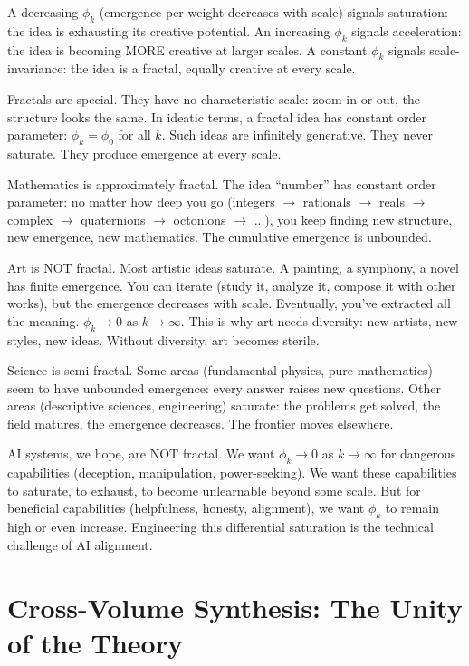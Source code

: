 \begin{interpretation}
A decreasing $\phi_k$ (emergence per weight decreases with scale) signals
saturation: the idea is exhausting its creative potential. An increasing $\phi_k$
signals acceleration: the idea is becoming MORE creative at larger scales. A
constant $\phi_k$ signals scale-invariance: the idea is a fractal, equally
creative at every scale.

Fractals are special. They have no characteristic scale: zoom in or out, the
structure looks the same. In ideatic terms, a fractal idea has constant order
parameter: $\phi_k = \phi_0$ for all $k$. Such ideas are infinitely generative.
They never saturate. They produce emergence at every scale.

Mathematics is approximately fractal. The idea ``number'' has constant order
parameter: no matter how deep you go (integers $\to$ rationals $\to$ reals $\to$
complex $\to$ quaternions $\to$ octonions $\to$ ...), you keep finding new
structure, new emergence, new mathematics. The cumulative emergence is unbounded.

Art is NOT fractal. Most artistic ideas saturate. A painting, a symphony, a novel
has finite emergence. You can iterate (study it, analyze it, compose it with
other works), but the emergence decreases with scale. Eventually, you've extracted
all the meaning. $\phi_k \to 0$ as $k \to \infty$. This is why art needs diversity:
new artists, new styles, new ideas. Without diversity, art becomes sterile.

Science is semi-fractal. Some areas (fundamental physics, pure mathematics) seem
to have unbounded emergence: every answer raises new questions. Other areas
(descriptive sciences, engineering) saturate: the problems get solved, the field
matures, the emergence decreases. The frontier moves elsewhere.

AI systems, we hope, are NOT fractal. We want $\phi_k \to 0$ as $k \to \infty$
for dangerous capabilities (deception, manipulation, power-seeking). We want
these capabilities to saturate, to exhaust, to become unlearnable beyond some
scale. But for beneficial capabilities (helpfulness, honesty, alignment), we want
$\phi_k$ to remain high or even increase. Engineering this differential saturation
is the technical challenge of AI alignment.
\end{interpretation}


\section{Cross-Volume Synthesis: The Unity of the Theory}

